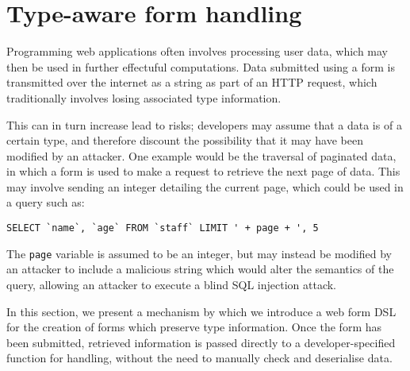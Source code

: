 \documentclass[preprint]{sigplanconf}
\begin{document}

\section{Type-aware form handling}
\label{form}
Programming web applications often involves processing user data, which may then be used in further effectuful computations. Data submitted using a form is transmitted over the internet as a string as part of an HTTP request, which traditionally involves losing associated type information. 

This can in turn increase lead to risks; developers may assume that a data is of a certain type, and therefore discount the possibility that it may have been modified by an attacker. One example would be the traversal of paginated data, in which a form is used to make a request to retrieve the next page of data. This may involve sending an integer detailing the current page, which could be used in a query such as:

{\small
\begin{verbatim}
SELECT `name`, `age` FROM `staff` LIMIT ' + page + ', 5
\end{verbatim}
}
The \texttt{page} variable is assumed to be an integer, but may instead be modified by an attacker to include a malicious string which would alter the semantics of the query, allowing an attacker to execute a blind SQL injection attack. %

In this section, we present a mechanism by which we introduce a web form DSL for the creation of forms which preserve type information. Once the form has been submitted, retrieved information is passed directly to a developer-specified function for handling, without the need to manually check and deserialise data. 
\end{document}
